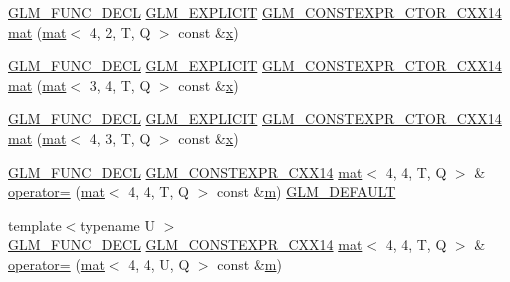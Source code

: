 \begin{DoxyCompactItemize}
\item 
\hyperlink{setup_8hpp_ab2d052de21a70539923e9bcbf6e83a51}{G\+L\+M\+\_\+\+F\+U\+N\+C\+\_\+\+D\+E\+CL} \hyperlink{setup_8hpp_a6c74f5a5e7b134ab69023ff9a30d4d5d}{G\+L\+M\+\_\+\+E\+X\+P\+L\+I\+C\+IT} \hyperlink{setup_8hpp_a0900f9145e68bf6061b6f5e7be3fa751}{G\+L\+M\+\_\+\+C\+O\+N\+S\+T\+E\+X\+P\+R\+\_\+\+C\+T\+O\+R\+\_\+\+C\+X\+X14} \hyperlink{structglm_1_1mat_3_014_00_014_00_01_t_00_01_q_01_4_aee353d4eaf8d262f59a1ab86a07c41fd}{mat} (\hyperlink{structglm_1_1mat}{mat}$<$ 4, 2, T, Q $>$ const \&\hyperlink{_s_d_l__opengl_8h_ad0e63d0edcdbd3d79554076bf309fd47}{x})
\item 
\hyperlink{setup_8hpp_ab2d052de21a70539923e9bcbf6e83a51}{G\+L\+M\+\_\+\+F\+U\+N\+C\+\_\+\+D\+E\+CL} \hyperlink{setup_8hpp_a6c74f5a5e7b134ab69023ff9a30d4d5d}{G\+L\+M\+\_\+\+E\+X\+P\+L\+I\+C\+IT} \hyperlink{setup_8hpp_a0900f9145e68bf6061b6f5e7be3fa751}{G\+L\+M\+\_\+\+C\+O\+N\+S\+T\+E\+X\+P\+R\+\_\+\+C\+T\+O\+R\+\_\+\+C\+X\+X14} \hyperlink{structglm_1_1mat_3_014_00_014_00_01_t_00_01_q_01_4_a18e01bcf567b007e9c03d477dc3e63f7}{mat} (\hyperlink{structglm_1_1mat}{mat}$<$ 3, 4, T, Q $>$ const \&\hyperlink{_s_d_l__opengl_8h_ad0e63d0edcdbd3d79554076bf309fd47}{x})
\item 
\hyperlink{setup_8hpp_ab2d052de21a70539923e9bcbf6e83a51}{G\+L\+M\+\_\+\+F\+U\+N\+C\+\_\+\+D\+E\+CL} \hyperlink{setup_8hpp_a6c74f5a5e7b134ab69023ff9a30d4d5d}{G\+L\+M\+\_\+\+E\+X\+P\+L\+I\+C\+IT} \hyperlink{setup_8hpp_a0900f9145e68bf6061b6f5e7be3fa751}{G\+L\+M\+\_\+\+C\+O\+N\+S\+T\+E\+X\+P\+R\+\_\+\+C\+T\+O\+R\+\_\+\+C\+X\+X14} \hyperlink{structglm_1_1mat_3_014_00_014_00_01_t_00_01_q_01_4_a1746fc25fd23ff306177f092608bddc1}{mat} (\hyperlink{structglm_1_1mat}{mat}$<$ 4, 3, T, Q $>$ const \&\hyperlink{_s_d_l__opengl_8h_ad0e63d0edcdbd3d79554076bf309fd47}{x})
\item 
\hyperlink{setup_8hpp_ab2d052de21a70539923e9bcbf6e83a51}{G\+L\+M\+\_\+\+F\+U\+N\+C\+\_\+\+D\+E\+CL} \hyperlink{setup_8hpp_a4dd12abf5e1164bc57f3a34671d03844}{G\+L\+M\+\_\+\+C\+O\+N\+S\+T\+E\+X\+P\+R\+\_\+\+C\+X\+X14} \hyperlink{structglm_1_1mat}{mat}$<$ 4, 4, T, Q $>$ \& \hyperlink{structglm_1_1mat_3_014_00_014_00_01_t_00_01_q_01_4_a4319e1de5928bc4747e149b160ba5d9a}{operator=} (\hyperlink{structglm_1_1mat}{mat}$<$ 4, 4, T, Q $>$ const \&\hyperlink{_s_d_l__opengl__glext_8h_af593500c283bf1a787a6f947f503a5c2}{m}) \hyperlink{setup_8hpp_aefce7051c376a64ba89fa93a9f63bc2c}{G\+L\+M\+\_\+\+D\+E\+F\+A\+U\+LT}
\item 
{\footnotesize template$<$typename U $>$ }\\\hyperlink{setup_8hpp_ab2d052de21a70539923e9bcbf6e83a51}{G\+L\+M\+\_\+\+F\+U\+N\+C\+\_\+\+D\+E\+CL} \hyperlink{setup_8hpp_a4dd12abf5e1164bc57f3a34671d03844}{G\+L\+M\+\_\+\+C\+O\+N\+S\+T\+E\+X\+P\+R\+\_\+\+C\+X\+X14} \hyperlink{structglm_1_1mat}{mat}$<$ 4, 4, T, Q $>$ \& \hyperlink{structglm_1_1mat_3_014_00_014_00_01_t_00_01_q_01_4_a240690716d4c5dc0b562b051b5fc71af}{operator=} (\hyperlink{structglm_1_1mat}{mat}$<$ 4, 4, U, Q $>$ const \&\hyperlink{_s_d_l__opengl__glext_8h_af593500c283bf1a787a6f947f503a5c2}{m})

\end{DoxyCompactItemize}
